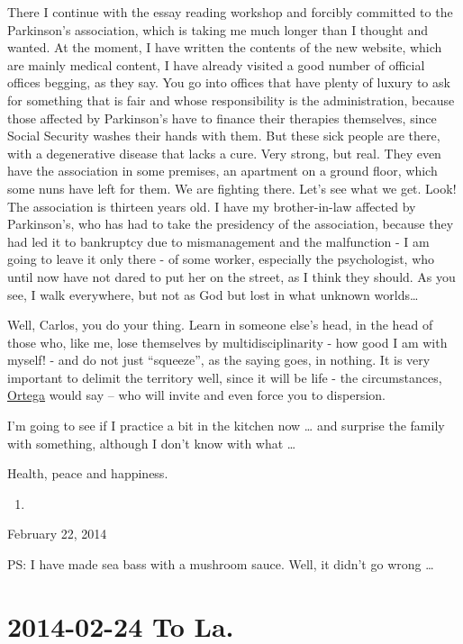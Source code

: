 \documentclass[]{book}
\begin{document}
There I continue with the essay reading workshop and forcibly committed to the Parkinson's association, which is taking me much longer than I thought and wanted. At the moment, I have written the contents of the new website, which are mainly medical content, I have already visited a good number of official offices begging, as they say. You go into offices that have plenty of luxury to ask for something that is fair and whose responsibility is the administration, because those affected by Parkinson's have to finance their therapies themselves, since Social Security washes their hands with them. But these sick people are there, with a degenerative disease that lacks a cure. Very strong, but real. They even have the association in some premises, an apartment on a ground floor, which some nuns have left for them. We are fighting there. Let's see what we get. Look! The association is thirteen years old. I have my brother-in-law affected by Parkinson's, who has had to take the presidency of the association, because they had led it to bankruptcy due to mismanagement and the malfunction - I am going to leave it only there - of some worker, especially the psychologist, who until now have not dared to put her on the street, as I think they should. As you see, I walk everywhere, but not as God but lost in what unknown worlds\ldots{}

Well, Carlos, you do your thing. Learn in someone else's head, in the head of those who, like me, lose themselves by multidisciplinarity - how good I am with myself! - and do not just ``squeeze'', as the saying goes, in nothing. It is very important to delimit the territory well, since it will be life - the circumstances, \href{https://en.wikipedia.org/wiki/Jos\%C3\%A9_Ortega_y_Gasset}{Ortega} would say -- who will invite and even force you to dispersion.

I'm going to see if I practice a bit in the kitchen now \ldots{} and surprise the family with something, although I don't know with what \ldots{}

Health, peace and happiness.

\begin{enumerate}
\def\labelenumi{\Alph{enumi}.}
\setcounter{enumi}{19}
\item
\end{enumerate}

February 22, 2014

PS: I have made sea bass with a mushroom sauce. Well, it didn't go wrong \ldots{}

\hypertarget{toLa20140224}{%
\section*{2014-02-24 To La.}\label{toLa20140224}}
\end{document}
